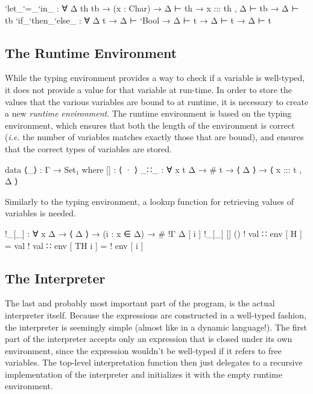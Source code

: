 \documentclass{article}
\begin{document}
\begin{code}
    `let_`=_`in_     : ∀ {Δ th tb} → (x : Char) 
                         → Δ ⊢ th → x ::: th , Δ ⊢ tb → Δ ⊢ tb
    `if_`then_`else_ : ∀ {Δ t} → Δ ⊢ `Bool → Δ ⊢ t → Δ ⊢ t → Δ ⊢ t
\end{code}

\subsection{The Runtime Environment}
\label{sub:TheRuntimeEnvironment}
While the typing environment provides a way to check if a variable is well-typed, it does not provide
a value for that variable at run-time. In order to store the values that the various variables are bound to
at runtime, it is necessary to create a new \textit{runtime environment}. The runtime environment is based
on the typing environment, which ensures that both the length of the environment is correct (\textit{i.e.} the number of variables matches exactly those that are bound),
and ensures that the correct types of variables are stored.

\begin{code}
   data ⟨_⟩ : Γ → Set₁ where
      []   : ⟨ · ⟩
      _∷_  : ∀ {x t Δ} → # t → ⟨ Δ ⟩ → ⟨ x ::: t , Δ ⟩
\end{code}

Similarly to the typing environment, a lookup function for retrieving values of variables is needed.

\begin{code}
  !_[_] : ∀ {x Δ} → ⟨ Δ ⟩ → (i : x ∈ Δ) → # !Γ Δ [ i ]
  !_[_] [] ()
  ! val ∷ env [ H ]     = val
  ! val ∷ env [ TH i ]  = ! env [ i ]
\end{code}

\subsection{The Interpreter}
\label{sub:TheIntepreter}
The last and probably most important part of the program, is the actual interpreter itself. Because the expressions are constructed in a well-typed fashion,
the interpreter is seemingly simple (almost like in a dynamic language!).
The first part of the interpreter accepts only an expression that is closed under its own environment, since the expression wouldn't be well-typed if
it refers to free variables.
The top-level interpretation function then just delegates to a recursive implementation of the interpreter and initializes it with the empty runtime environment.
\end{document}
